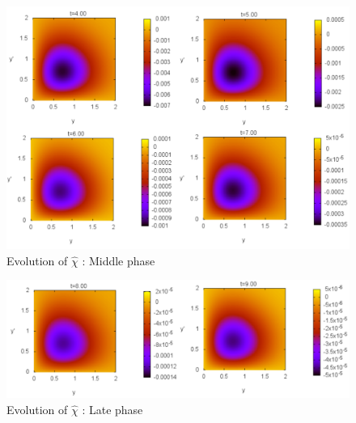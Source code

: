 \documentclass[jcp,groupaddress]{revtex4-1}
\begin{document}
\begin{figure}[H]
\begin{center}
   \includegraphics[scale=0.4]{plots/Plotpanel2.pdf} 
  \caption{Evolution of $\hat{\chi}$ : Middle phase}
  \label{Panel2}
 \end{center}
\end{figure}  
\begin{figure}[H]
\begin{center}
   \includegraphics[scale=0.4]{plots/Plotpanel3.pdf} 
  \caption{Evolution of $\hat{\chi}$ : Late phase}
  \label{Panel3}
 \end{center}
\end{figure}  
\end{document}
